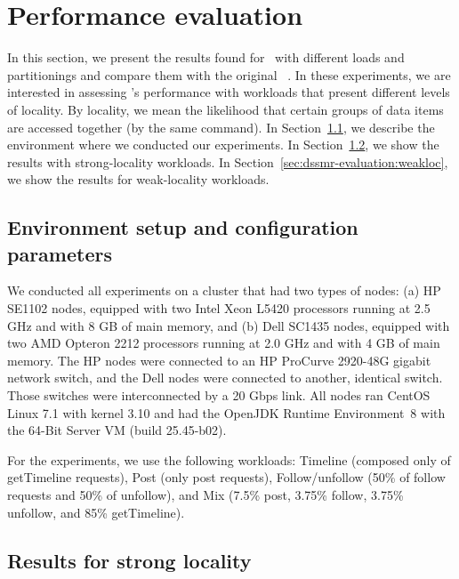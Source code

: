 \section{Performance evaluation}
\label{sec:dssmr-experiments}

In this section, we present the results found for \dssmrappname\ with different
loads and partitionings and compare them with the original
\ssmr{}~\cite{bezerra2014ssmr}. In these experiments, we are interested in
assessing \dssmr{}'s performance with workloads that present different levels of
locality. By locality, we mean the likelihood that certain groups of data items
are accessed together (by the same command). In
Section~\ref{sec:dssmr-evaluation:setup}, we describe the environment where we
conducted our experiments. In Section~\ref{sec:dssmr-evaluation:strongloc}, we
show the results with strong-locality workloads. In
Section~\ref{sec:dssmr-evaluation:weakloc}, we show the results for
weak-locality workloads.


\subsection{Environment setup and configuration parameters}
\label{sec:dssmr-evaluation:setup}

We conducted all experiments on a cluster that had two types of nodes: (a) HP
SE1102 nodes, equipped with two Intel Xeon L5420 processors running at 2.5 GHz
and with 8 GB of main memory, and (b) Dell SC1435 nodes, equipped with two AMD
Opteron 2212 processors running at 2.0 GHz and with 4 GB of main memory. The HP
nodes were connected to an HP ProCurve 2920-48G gigabit network switch, and the
Dell nodes were connected to another, identical switch. Those switches were
interconnected by a 20 Gbps link. All nodes ran CentOS Linux 7.1 with kernel
3.10 and had the OpenJDK Runtime Environment~8 with the \mbox{64-Bit} Server VM
(build 25.45-b02).

For the experiments, we use the following workloads: Timeline (composed only of
getTimeline requests), Post (only post requests), Follow/unfollow (50\% of
follow requests and 50\% of unfollow), and Mix (7.5\% post, 3.75\% follow,
3.75\% unfollow, and 85\% getTimeline).

\subsection{Results for strong locality}
\label{sec:dssmr-evaluation:strongloc}


